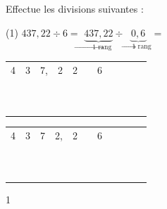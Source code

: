 \documentclass[a4paper,11pt]{report}
\begin{document}
\begin{exop}{
Effectue les divisions suivantes :
\begin{tasks}(1)
\task $437,22 \div 6 =$
\task $\underbrace{437,22}_{\rightarrow\mbox{1 rang}} \div \underbrace{0,6}_{\rightarrow\mbox{1 rang}}=$
\end{tasks}

\bigskip

\begin{minipage}{0,45\linewidth}
\begin{tabular}{cccccc|ccccc}
4&3&7,&2&2 & &6 & & & & \\\cline{7-11}
& & & & & & & & & & \\
& & & & & & & & & & \\
& & & & & & & & & & \\
& & & & & & & & & & \\
& & & & & & & & & & \\
& & & & & & & & & & \\
& & & & & & & & & & \\
& & & & & & & & & & \\
& & & & & & & & & & \\
& & & & & & & & & & \\
\end{tabular}
\end{minipage} \hfill
\begin{minipage}{0,45\linewidth}
\begin{tabular}{cccccc|ccccc}
4&3&7&2,&2 & &6 & & & & \\\cline{7-11}
& & & & & & & & & & \\
& & & & & & & & & & \\
& & & & & & & & & & \\
& & & & & & & & & & \\
& & & & & & & & & & \\
& & & & & & & & & & \\
& & & & & & & & & & \\
& & & & & & & & & & \\
& & & & & & & & & & \\
& & & & & & & & & & \\
\end{tabular}
\end{minipage}
}{1}
\end{exop}
\end{document}
